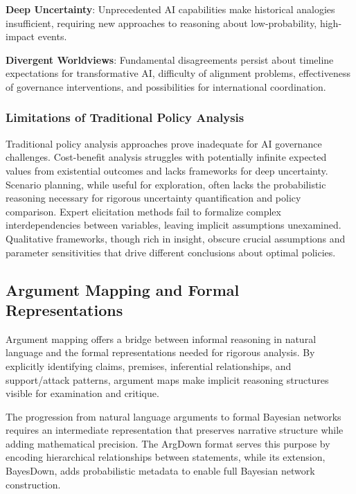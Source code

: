 \documentclass[
  11pt,
  letterpaper,
]{book}
\begin{document}
\textbf{Deep Uncertainty}: Unprecedented AI capabilities make historical
analogies insufficient, requiring new approaches to reasoning about
low-probability, high-impact events.

\textbf{Divergent Worldviews}: Fundamental disagreements persist about
timeline expectations for transformative AI, difficulty of alignment
problems, effectiveness of governance interventions, and possibilities
for international coordination.

\subsubsection{Limitations of Traditional Policy
Analysis}\label{sec-traditional-limitations}

Traditional policy analysis approaches prove inadequate for AI
governance challenges. Cost-benefit analysis struggles with potentially
infinite expected values from existential outcomes and lacks frameworks
for deep uncertainty. Scenario planning, while useful for exploration,
often lacks the probabilistic reasoning necessary for rigorous
uncertainty quantification and policy comparison. Expert elicitation
methods fail to formalize complex interdependencies between variables,
leaving implicit assumptions unexamined. Qualitative frameworks, though
rich in insight, obscure crucial assumptions and parameter sensitivities
that drive different conclusions about optimal policies.

\subsection{Argument Mapping and Formal
Representations}\label{sec-argument-mapping}

Argument mapping offers a bridge between informal reasoning in natural
language and the formal representations needed for rigorous analysis. By
explicitly identifying claims, premises, inferential relationships, and
support/attack patterns, argument maps make implicit reasoning
structures visible for examination and critique.

The progression from natural language arguments to formal Bayesian
networks requires an intermediate representation that preserves
narrative structure while adding mathematical precision. The ArgDown
format serves this purpose by encoding hierarchical relationships
between statements, while its extension, BayesDown, adds probabilistic
metadata to enable full Bayesian network construction.
\end{document}
